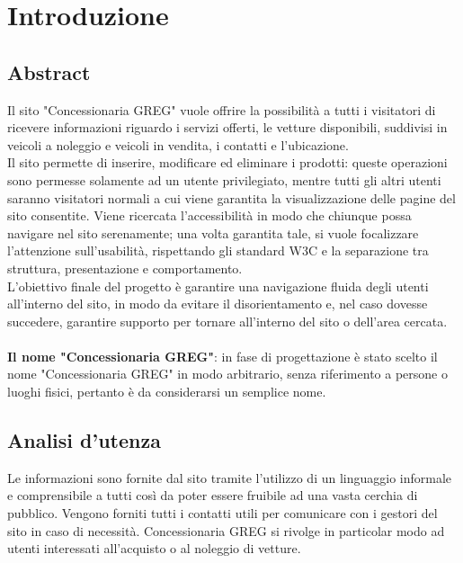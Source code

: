 \section{Introduzione}

\subsection{Abstract}
Il sito "Concessionaria GREG" vuole offrire la possibilità a tutti i visitatori di ricevere informazioni riguardo i servizi offerti, le vetture disponibili, suddivisi in veicoli a noleggio e veicoli in vendita, i contatti e l'ubicazione.\\
Il sito permette di inserire, modificare ed eliminare i prodotti: queste operazioni sono permesse solamente ad un utente privilegiato, mentre tutti gli altri utenti saranno visitatori normali a cui viene garantita la visualizzazione delle pagine del sito consentite. Viene ricercata l'accessibilità in modo che chiunque possa navigare nel sito serenamente; una volta garantita tale, si vuole focalizzare l'attenzione sull'usabilità, rispettando gli standard W3C e la separazione tra struttura, presentazione e comportamento.\\
L'obiettivo finale del progetto è garantire una navigazione fluida degli utenti all'interno del sito, in modo da evitare il disorientamento e, nel caso dovesse succedere, garantire supporto per tornare all'interno del sito o dell'area cercata.\\
\\
\textbf{Il nome "Concessionaria GREG"}: in fase di progettazione è stato scelto il nome "Concessionaria GREG" in modo arbitrario, senza riferimento a persone o luoghi fisici, pertanto è da considerarsi un semplice nome.\\

\subsection{Analisi d'utenza}
Le informazioni sono fornite dal sito tramite l'utilizzo di un linguaggio informale e comprensibile a tutti così da poter essere fruibile ad una vasta cerchia di pubblico. Vengono forniti tutti i contatti utili per comunicare con i gestori del sito in caso di necessità. Concessionaria GREG si rivolge in particolar modo ad utenti interessati all'acquisto o al noleggio di vetture.\\

\pagebreak